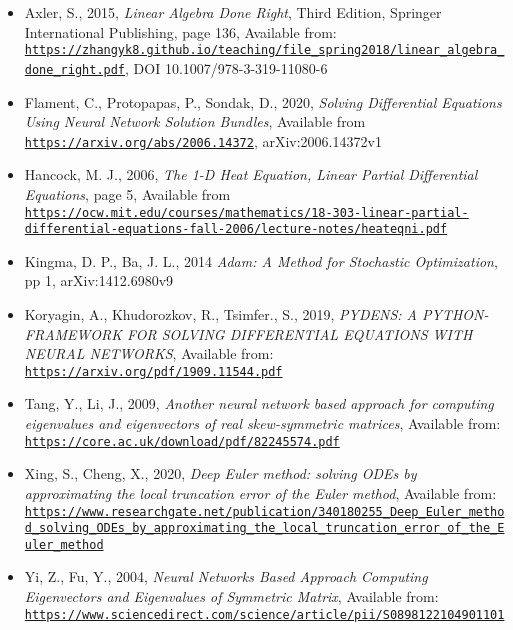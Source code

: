 \documentclass[12pt,a4paper]{article}
\begin{document}
\begin{itemize}
	\item Axler, S., 2015, \emph{Linear Algebra Done Right}, Third Edition, Springer International Publishing, page 136, Available from: \href{{https://zhangyk8.github.io/teaching/file_spring2018/linear_algebra_done_right.pdf}}{\nolinkurl{https://zhangyk8.github.io/teaching/file_spring2018/linear_algebra_done_right.pdf}}, DOI 10.1007/978-3-319-11080-6
	\item Flament, C., Protopapas, P., Sondak, D., 2020, \emph{Solving Differential Equations Using Neural Network Solution Bundles}, Available from \href{{https://arxiv.org/abs/2006.14372}}{\nolinkurl{https://arxiv.org/abs/2006.14372}}, arXiv:2006.14372v1
  \item Hancock, M. J., 2006, \emph{The 1-D Heat Equation, Linear Partial Differential Equations}, page 5, Available from \href{{https://ocw.mit.edu/courses/mathematics/18-303-linear-partial-differential-equations-fall-2006/lecture-notes/heateqni.pdf}}{\nolinkurl{https://ocw.mit.edu/courses/mathematics/18-303-linear-partial-differential-equations-fall-2006/lecture-notes/heateqni.pdf}}
  \item Kingma, D. P., Ba, J. L., 2014 \emph{Adam: A Method for Stochastic Optimization}, pp 1, arXiv:1412.6980v9
  \item Koryagin, A., Khudorozkov, R., Tsimfer., S., 2019, \emph{PYDENS: A PYTHON-FRAMEWORK FOR SOLVING DIFFERENTIAL EQUATIONS WITH NEURAL NETWORKS}, Available from: \href{{https://arxiv.org/pdf/1909.11544.pdf}}{\nolinkurl{https://arxiv.org/pdf/1909.11544.pdf}}
  \item Tang, Y., Li, J., 2009, \emph{Another neural network based approach for computing eigenvalues and eigenvectors of real skew-symmetric matrices}, Available from: \href{{https://core.ac.uk/download/pdf/82245574.pdf}}{\nolinkurl{https://core.ac.uk/download/pdf/82245574.pdf}}
  \item Xing, S., Cheng, X., 2020, \emph{Deep Euler method: solving ODEs by approximating the local truncation error of the Euler method}, Available from: \href{{https://www.researchgate.net/publication/340180255_Deep_Euler_method_solving_ODEs_by_approximating_the_local_truncation_error_of_the_Euler_method}}{\nolinkurl{https://www.researchgate.net/publication/340180255_Deep_Euler_method_solving_ODEs_by_approximating_the_local_truncation_error_of_the_Euler_method}}
  \item Yi, Z., Fu, Y., 2004, \emph{Neural Networks Based Approach Computing Eigenvectors and Eigenvalues of Symmetric Matrix}, Available from: \href{{https://www.sciencedirect.com/science/article/pii/S0898122104901101}}{\nolinkurl{https://www.sciencedirect.com/science/article/pii/S0898122104901101}}
\end{itemize}
\end{document}
